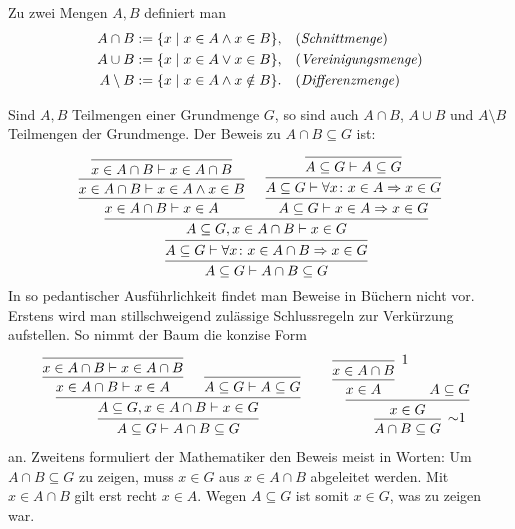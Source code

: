 \begin{Definition}%
%
\newlinefirst
Zu zwei Mengen $A,B$ definiert man
\begin{align*}
A\cap B &:= \{x\mid x\in A\land x\in B\}, && \text{(\emph{Schnittmenge})}\\
A\cup B &:= \{x\mid x\in A\lor x\in B\}, && \text{(\emph{Vereinigungsmenge})}\\
A\setminus B &:= \{x\mid x\in A\land x\notin B\}. && \text{(\emph{Differenzmenge})}
\end{align*}
\end{Definition}
Sind $A,B$ Teilmengen einer Grundmenge $G$, so sind auch
$A\cap B$, $A\cup B$ und $A\setminus B$ Teilmengen der Grundmenge.
Der Beweis zu $A\cap B\subseteq G$ ist:
\[
\begin{prooftree}
          \infer0{x\in A\cap B\vdash x\in A\cap B}
        \infer1{x\in A\cap B\vdash x\in A\land x\in B}
      \infer1{x\in A\cap B\vdash x\in A}
          \infer0{A\subseteq G\vdash A\subseteq G}
        \infer1{A\subseteq G\vdash \forall x\colon x\in A\cond x\in G}
      \infer1{A\subseteq G\vdash x\in A\cond x\in G}
    \infer2{A\subseteq G, x\in A\cap B\vdash x\in G}
  \infer1{A\subseteq G\vdash\forall x\colon x\in A\cap B\cond x\in G}
\infer1{A\subseteq G\vdash A\cap B\subseteq G}
\end{prooftree}
\]
In so pedantischer Ausführlichkeit findet man Beweise in Büchern
nicht vor. Erstens wird man stillschweigend zulässige Schlussregeln zur
Verkürzung aufstellen. So nimmt der Baum die konzise Form
\[
\begin{array}{@{}l@{\qquad\;}l}
\begin{prooftree}[center = false]
      \infer0{x\in A\cap B\vdash x\in A\cap B}
    \infer1{x\in A\cap B\vdash x\in A}
    \infer0{A\subseteq G\vdash A\subseteq G}
  \infer2{A\subseteq G,x\in A\cap B\vdash x\in G}
\infer1{A\subseteq G\vdash A\cap B\subseteq G}
\end{prooftree}
&
\begin{prooftree}[center = false]
      \infer0[1]{x\in A\cap B}
    \infer1{x\in A}
    \hypo{A\subseteq G}
  \infer2{x\in G}
\infer1[$\sim$1]{A\cap B\subseteq G}
\end{prooftree}
\end{array}
\]
an. Zweitens formuliert der Mathematiker den Beweis meist in Worten:
Um $A\cap B\subseteq G$ zu zeigen, muss $x\in G$ aus $x\in A\cap B$
abgeleitet werden. Mit $x\in A\cap B$ gilt erst recht $x\in A$.
Wegen $A\subseteq G$ ist somit $x\in G$, was zu zeigen war.\,\qedsymbol

